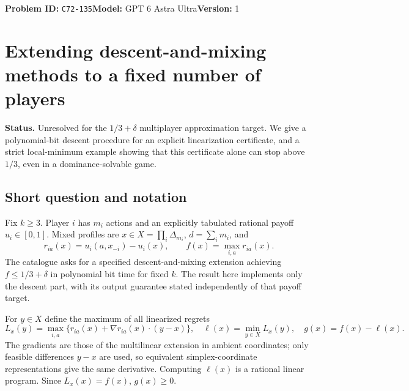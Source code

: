 \documentclass[11pt,a4paper]{article}
\begin{document}
\noindent\textbf{Problem ID:} \texttt{C72-135}\quad\textbf{Model:} GPT 6 Astra Ultra\quad\textbf{Version:} 1\par
\section*{Extending descent-and-mixing methods to a fixed number of players}

\textbf{Status.} Unresolved for the $1/3+\delta$ multiplayer approximation target. We give a polynomial-bit descent procedure for an explicit linearization certificate, and a strict local-minimum example showing that this certificate alone can stop above $1/3$, even in a dominance-solvable game.

\subsection*{Short question and notation}
Fix $k\geq3$. Player $i$ has $m_i$ actions and an explicitly tabulated rational payoff $u_i\in[0,1]$. Mixed profiles are $x\in X=\prod_i\Delta_{m_i}$, $d=\sum_i m_i$, and
\[
 r_{ia}(x)=u_i(a,x_{-i})-u_i(x),\qquad
 f(x)=\max_{i,a}r_{ia}(x).
\]
The catalogue asks for a specified descent-and-mixing extension achieving $f\leq1/3+\delta$ in polynomial bit time for fixed $k$. The result here implements only the descent part, with its output guarantee stated independently of that payoff target.

For $y\in X$ define the maximum of all linearized regrets
\[
 L_x(y)=\max_{i,a}\{r_{ia}(x)+\nabla r_{ia}(x)\cdot(y-x)\},
 \quad \ell(x)=\min_{y\in X}L_x(y),\quad g(x)=f(x)-\ell(x).
\]
The gradients are those of the multilinear extension in ambient coordinates; only feasible differences $y-x$ are used, so equivalent simplex-coordinate representations give the same derivative. Computing $\ell(x)$ is a rational linear program. Since $L_x(x)=f(x)$, $g(x)\geq0$.
\end{document}
